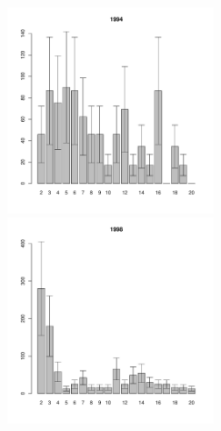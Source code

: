 \begin{figure}[hp]
	\begin{minipage}[b]{.3\linewidth}
	\begin{center}
	\includegraphics[width=60mm]{../White_Sea/Luvenga_II_razrez/low_beatch2_1994_.pdf}
	\end{center}
	\end{minipage}
	\hfill
	\begin{minipage}[b]{.3\linewidth}
	\begin{center}
	\includegraphics[width=60mm]{../White_Sea/Luvenga_II_razrez/low_beatch2_1998_.pdf}
	\end{center}
	\end{minipage}	
	\hfill
	\begin{minipage}[b]{.3\linewidth}
	\begin{center}

	\end{center}
	\end{minipage}


\end{figure}
